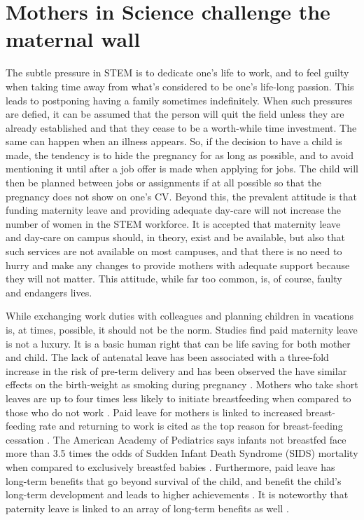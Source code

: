\documentclass[utf8]{frontiersSCNS} %
\begin{document}
\section{Mothers in Science challenge the maternal wall}
\label{Sec8}
The subtle pressure in STEM is to dedicate one's life to work, and to feel guilty when taking time away from what's considered to be one's life-long passion. This leads to postponing having a family sometimes indefinitely. When such pressures are defied, it can be assumed that the person will quit the field unless they are already established and that they cease to be a worth-while time investment. The same can happen when an illness appears. So, if the decision to have a child is made, the tendency is to hide the pregnancy for as long as possible, and to avoid mentioning it until after a job offer is made when applying for jobs. The child will then be planned between jobs or assignments if at all possible so that the pregnancy does not show on one's CV. Beyond this, the prevalent attitude is that funding maternity leave and providing adequate day-care will not increase the number of women in the STEM workforce. It is accepted that maternity leave and day-care on campus should, in theory, exist and be available, but also that such services are not available on most campuses, and that there is no need to hurry and make any changes to provide mothers with adequate support because they will not matter. This attitude, while far too common, is, of course, faulty and endangers lives.

While exchanging work duties with colleagues and planning children in vacations is, at times, possible, it should not be the norm.  Studies find paid maternity leave is not a luxury. It is a basic human right that can be life saving for both mother and child. The lack of antenatal leave has been associated with a three-fold increase in the risk of pre-term delivery and has been observed the have similar effects on the birth-weight as smoking during pregnancy \citep{ceron1996risk,del2012intrafamily}. Mothers who take short leaves are up to four times less likely to initiate breastfeeding when compared to those who do not work \citep{huang2015paid,baker2008maternal}. Paid leave for mothers is linked to increased breast-feeding rate and returning to work is cited as the top reason for breast-feeding cessation \citep{schwartz2002factors}. The American Academy of Pediatrics says infants not breastfed face more than 3.5 times the odds of Sudden Infant Death Syndrome (SIDS) mortality when compared to exclusively breastfed babies \citep{eidelman2012breastfeeding}. Furthermore, paid leave has long-term benefits that go beyond survival of the child, and benefit the child's long-term development and leads to higher achievements \citep{berger2005maternity,carneiro2015flying}. It is noteworthy that paternity leave is linked to an array of long-term benefits as well \citep{huerta2013fathers}.
\end{document}
